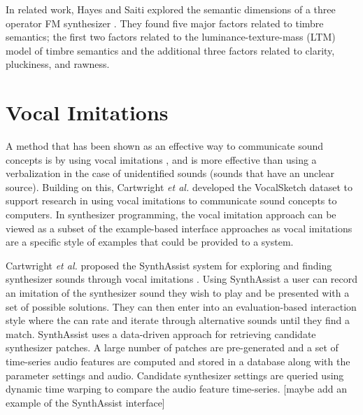 In related work, Hayes and Saiti explored the semantic dimensions of a three operator FM synthesizer \cite{hayes2020there}. %
They found five major factors related to timbre semantics; the first two factors related to the  luminance-texture-mass (LTM) model of timbre semantics \cite{zacharakis2012interlanguage} and the additional three factors related to clarity, pluckiness, and rawness.


\section{Vocal Imitations}
A method that has been shown as an effective way to communicate sound concepts is by using vocal imitations \cite{lemaitre2014effectiveness}, and is more effective than using a verbalization in the case of unidentified sounds (sounds that have an unclear source). Building on this, Cartwright \textit{et al.} developed the VocalSketch dataset \cite{cartwright2015vocalsketch} to support research in using vocal imitations to communicate sound concepts to computers. In synthesizer programming, the vocal imitation approach can be viewed as a subset of the example-based interface approaches as vocal imitations are a specific style of examples that could be provided to a system.

Cartwright \textit{et al.} proposed the SynthAssist system for exploring and finding synthesizer sounds through vocal imitations \cite{cartwright2014synthassist}. Using SynthAssist a user can record an imitation of the synthesizer sound they wish to play and be presented with a set of possible solutions. They can then enter into an evaluation-based interaction style where the can rate and iterate through alternative sounds until they find a match. SynthAssist uses a data-driven approach for retrieving candidate synthesizer patches. A large number of patches are pre-generated and a set of time-series audio features are computed and stored in a database along with the parameter settings and audio. Candidate synthesizer settings are queried using dynamic time warping to compare the audio feature time-series. [maybe add an example of the SynthAssist interface]

